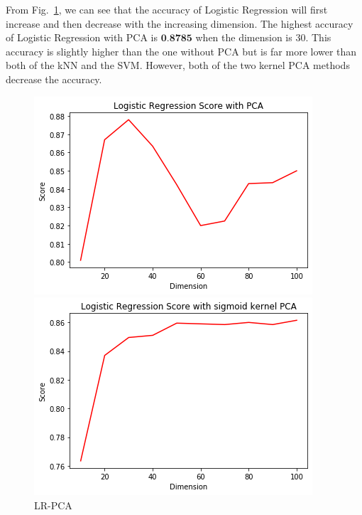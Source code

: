 \documentclass[12pt]{article}
\begin{document}
From Fig.~\ref{fig:LR-PCA}, we can see that the accuracy of Logistic Regression will first increase and then decrease with the increasing dimension. The highest accuracy of Logistic Regression with PCA is $\textbf{0.8785}$ when the dimension is 30. This accuracy is slightly higher than the one without PCA but is far more lower than both of the kNN and the SVM. However, both of the two kernel PCA methods decrease the accuracy.
\begin{figure}[htb]
	\centering
	\begin{minipage}{.3\textwidth}
		\centering
		\includegraphics[width=\linewidth]{./exp-figs/LR-PCA.png}
		\caption{LR-PCA}
		\label{fig:LR-PCA}
	\end{minipage}%
	\begin{minipage}{0.3\textwidth}
		\centering
		\includegraphics[width=\linewidth]{./exp-figs/LR-SIG-KPCA.png}

\end{minipage}
\end{figure}
\end{document}
